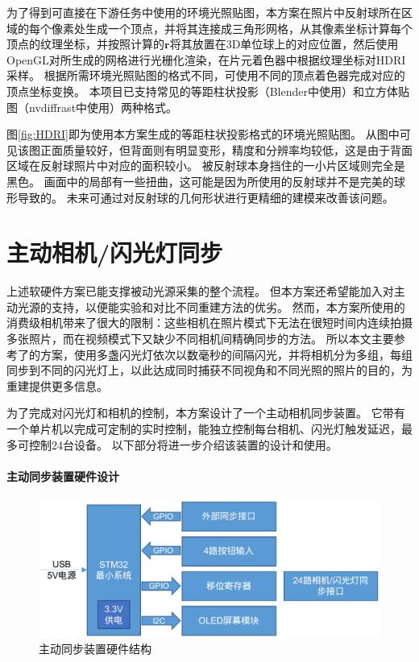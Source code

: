 为了得到可直接在下游任务中使用的环境光照贴图，本方案在照片中反射球所在区域的每个像素处生成一个顶点，并将其连接成三角形网格，从其像素坐标计算每个顶点的纹理坐标，并按照计算的$\mathbf{r}$将其放置在3D单位球上的对应位置，然后使用OpenGL对所生成的网格进行光栅化渲染，在片元着色器中根据纹理坐标对HDRI采样。
根据所需环境光照贴图的格式不同，可使用不同的顶点着色器完成对应的顶点坐标变换。
本项目已支持常见的等距柱状投影（Blender中使用）和立方体贴图（nvdiffrast中使用）两种格式。

图\ref{fig:HDRI}即为使用本方案生成的等距柱状投影格式的环境光照贴图。
从图中可见该图正面质量较好，但背面则有明显变形，精度和分辨率均较低，这是由于背面区域在反射球照片中对应的面积较小。
被反射球本身挡住的一小片区域则完全是黑色。
画面中的局部有一些扭曲，这可能是因为所使用的反射球并不是完美的球形导致的。
未来可通过对反射球的几何形状进行更精细的建模来改善该问题。

\section{主动相机/闪光灯同步}

上述软硬件方案已能支撑被动光源采集的整个流程。
但本方案还希望能加入对主动光源的支持，以便能实验和对比不同重建方法的优劣。
然而，本方案所使用的消费级相机带来了很大的限制：这些相机在照片模式下无法在很短时间内连续拍摄多张照片，而在视频模式下又缺少不同相机间精确同步的方法。
所以本文主要参考了\citet{FyffeGTGD16}的方案，使用多盏闪光灯依次以数毫秒的间隔闪光，并将相机分为多组，每组同步到不同的闪光灯上，以此达成同时捕获不同视角和不同光照的照片的目的，为重建提供更多信息。

为了完成对闪光灯和相机的控制，本方案设计了一个主动相机同步装置。
它带有一个单片机以完成可定制的实时控制，能独立控制每台相机、闪光灯触发延迟，最多可控制24台设备。
以下部分将进一步介绍该装置的设计和使用。

\paragraph{主动同步装置硬件设计}

\begin{figure}
\centering
\includegraphics[width=0.8\linewidth]{figures/active_sync.png}
\caption{主动同步装置硬件结构}
\label{fig:active_sync}
\end{figure}

